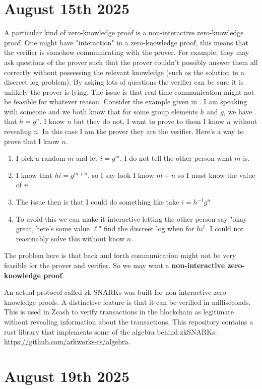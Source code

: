 \documentclass{amsart}
\theoremstyle{definition}
\begin{document}
\section{August 15th 2025}
A particular kind of zero-knowledge proof is a non-interactive zero-knowledge proof. One might have "interaction" in a zero-knowledge proof, this means that the verifier is somehow communicating with the prover. For example, they may ask questions of the prover such that the prover couldn't possibly answer them all correctly without possessing the relevant knowledge (such as the solution to a discreet log problem). By asking lots of questions the verifier can be sure it is unlikely the prover is lying. The issue is that real-time communication might not be feasible for whatever reason. Consider the example given in \cite[Section 7.2.1]{Wong}. I am speaking with someone and we both know that for some group elements $h$ and $g$, we have that $h=g^n$. I know $n$ but they do not, I want to prove to them I know $n$ without revealing $n$. In this case I am the prover they are the verifier. Here's a way to prove that I know $n$.
\begin{enumerate}
    \item I pick a random $m$ and let $i=g^m$, I do not tell the other person what $m$ is.
    \item I know that $hi=g^{m+n}$, so I say look I know $m+n$ so I must know the value of $n$
    \item The issue then is that I could do something like take $i=h^{-1}g^{n}$
    \item To avoid this we can make it interactive letting the other person say "okay great, here's some value $\ell$" find the discreet log when for $hi^{\ell}$. I could not reasonably solve this without know $n$.
\end{enumerate}
The problem here is that back and forth communication might not be very feasible for the prover and verifier. So we may want a \textbf{non-interactive zero-knowledge proof}. 

An actual protocol called zk-SNARKs was built for non-interactive zero-knowledge proofs. A distinctive feature is that it can be verified in milliseconds. This is used in Zcash to verify transactions in the blockchain as legitimate without revealing information about the transactions. This repository contains a rust library that implements some of the algebra behind zkSNARKs: \url{https://github.com/arkworks-rs/algebra}.

\section{August 19th 2025}
\end{document}
